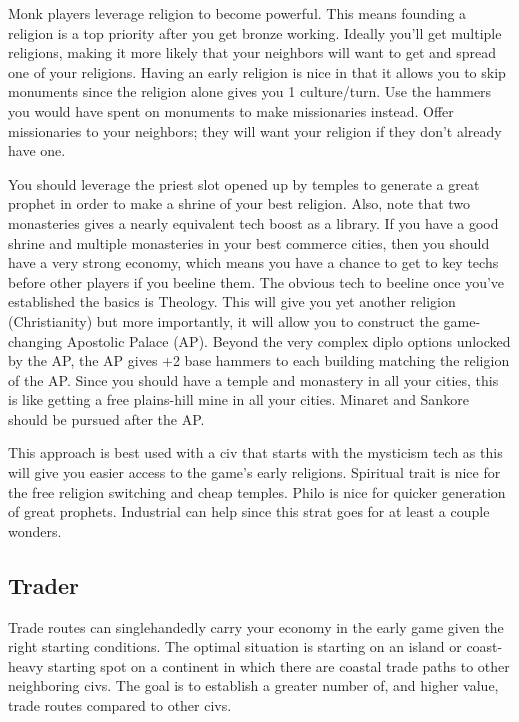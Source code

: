 \documentclass[10pt]{article}
\begin{document}
Monk players leverage religion to become powerful. This means founding
a religion is a top priority after you get bronze working. Ideally
you'll get multiple religions, making it more likely that your
neighbors will want to get and spread one of your religions. Having an
early religion is nice in that it allows you to skip monuments since
the religion alone gives you 1 culture/turn. Use the hammers you would
have spent on monuments to make missionaries instead. Offer
missionaries to your neighbors; they will want your religion if they
don't already have one.

You should leverage the priest slot opened up
by temples to generate a great prophet in order to make a shrine of
your best religion. Also, note that two monasteries gives a nearly
equivalent tech boost as a library. If you have a good shrine and
multiple monasteries in your best commerce cities, then you should have
a very strong economy, which means you have a chance to get to key
techs before other players if you beeline them. The obvious tech to
beeline once you've established the basics is Theology. This will give
you yet another religion (Christianity) but more importantly, it will
allow you to construct the game-changing Apostolic Palace (AP). Beyond
the very complex diplo options unlocked by the AP, the AP gives +2
base hammers to each building matching the religion of the AP. Since
you should have a temple and monastery in all your cities, this is
like getting a free plains-hill mine in all your cities.  Minaret and
Sankore should be pursued after the AP.

This approach is best used with a civ that starts with the mysticism
tech as this will give you easier access to the game's early
religions. Spiritual trait is nice for the free religion switching and
cheap temples.  Philo is nice for quicker generation of great
prophets. Industrial can help since this strat goes for at least a
couple wonders.

\subsection*{Trader}

Trade routes can singlehandedly carry your economy in the early game
given the right starting conditions.  The optimal situation is
starting on an island or coast-heavy starting spot on a continent in
which there are coastal trade paths to other neighboring civs. The
goal is to establish a greater number of, and higher value, trade
routes compared to other civs.
\end{document}
